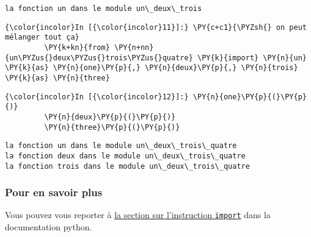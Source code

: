     \begin{Verbatim}[commandchars=\\\{\}]
la fonction un dans le module un\_deux\_trois

    \end{Verbatim}

    \begin{Verbatim}[commandchars=\\\{\}]
{\color{incolor}In [{\color{incolor}11}]:} \PY{c+c1}{\PYZsh{} on peut mélanger tout ça}
         \PY{k+kn}{from} \PY{n+nn}{un\PYZus{}deux\PYZus{}trois\PYZus{}quatre} \PY{k}{import} \PY{n}{un} \PY{k}{as} \PY{n}{one}\PY{p}{,} \PY{n}{deux}\PY{p}{,} \PY{n}{trois} \PY{k}{as} \PY{n}{three}
\end{Verbatim}


    \begin{Verbatim}[commandchars=\\\{\}]
{\color{incolor}In [{\color{incolor}12}]:} \PY{n}{one}\PY{p}{(}\PY{p}{)}
         \PY{n}{deux}\PY{p}{(}\PY{p}{)}
         \PY{n}{three}\PY{p}{(}\PY{p}{)}
\end{Verbatim}


    \begin{Verbatim}[commandchars=\\\{\}]
la fonction un dans le module un\_deux\_trois\_quatre
la fonction deux dans le module un\_deux\_trois\_quatre
la fonction trois dans le module un\_deux\_trois\_quatre

    \end{Verbatim}

    \hypertarget{pour-en-savoir-plus}{%
\subsubsection{Pour en savoir plus}\label{pour-en-savoir-plus}}

    Vous pouvez vous reporter à
\href{https://docs.python.org/3/reference/simple_stmts.html\#the-import-statement}{la
section sur l'instruction \texttt{import}} dans la documentation python.


    
    
    

